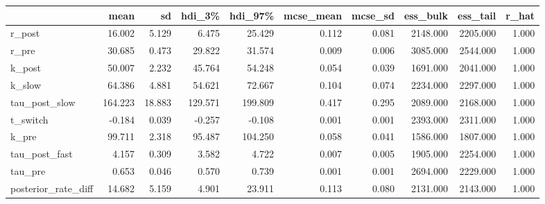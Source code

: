 \begin{tabular}{lrrrrrrrrr}
\toprule
 & mean & sd & hdi\_3\% & hdi\_97\% & mcse\_mean & mcse\_sd & ess\_bulk & ess\_tail & r\_hat \\
\midrule
r\_post & 16.002 & 5.129 & 6.475 & 25.429 & 0.112 & 0.081 & 2148.000 & 2205.000 & 1.000 \\
r\_pre & 30.685 & 0.473 & 29.822 & 31.574 & 0.009 & 0.006 & 3085.000 & 2544.000 & 1.000 \\
k\_post & 50.007 & 2.232 & 45.764 & 54.248 & 0.054 & 0.039 & 1691.000 & 2041.000 & 1.000 \\
k\_slow & 64.386 & 4.881 & 54.621 & 72.667 & 0.104 & 0.074 & 2234.000 & 2297.000 & 1.000 \\
tau\_post\_slow & 164.223 & 18.883 & 129.571 & 199.809 & 0.417 & 0.295 & 2089.000 & 2168.000 & 1.000 \\
t\_switch & -0.184 & 0.039 & -0.257 & -0.108 & 0.001 & 0.001 & 2393.000 & 2311.000 & 1.000 \\
k\_pre & 99.711 & 2.318 & 95.487 & 104.250 & 0.058 & 0.041 & 1586.000 & 1807.000 & 1.000 \\
tau\_post\_fast & 4.157 & 0.309 & 3.582 & 4.722 & 0.007 & 0.005 & 1905.000 & 2254.000 & 1.000 \\
tau\_pre & 0.653 & 0.046 & 0.570 & 0.739 & 0.001 & 0.001 & 2694.000 & 2229.000 & 1.000 \\
posterior\_rate\_diff & 14.682 & 5.159 & 4.901 & 23.911 & 0.113 & 0.080 & 2131.000 & 2143.000 & 1.000 \\
\bottomrule
\end{tabular}
